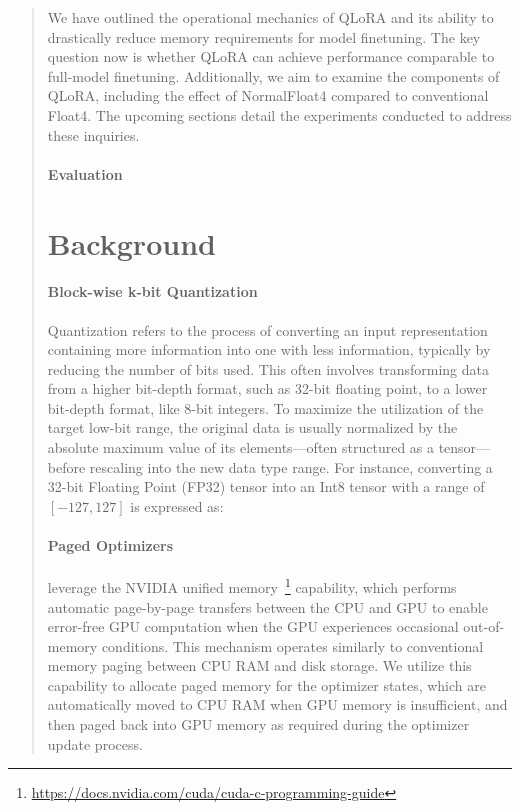 \begin{quote}
We have outlined the operational mechanics of QLoRA and its ability to drastically reduce memory requirements for model finetuning. The key question now is whether QLoRA can achieve performance comparable to full-model finetuning. Additionally, we aim to examine the components of QLoRA, including the effect of NormalFloat4 compared to conventional Float4. The upcoming sections detail the experiments conducted to address these inquiries.

\paragraph{Evaluation}

\section{Background}
\paragraph{Block-wise k-bit Quantization} Quantization refers to the process of converting an input representation containing more information into one with less information, typically by reducing the number of bits used. This often involves transforming data from a higher bit-depth format, such as 32-bit floating point, to a lower bit-depth format, like 8-bit integers. To maximize the utilization of the target low-bit range, the original data is usually normalized by the absolute maximum value of its elements—often structured as a tensor—before rescaling into the new data type range. For instance, converting a 32-bit Floating Point (FP32) tensor into an Int8 tensor with a range of $[-127, 127]$ is expressed as:

\paragraph{Paged Optimizers} leverage the NVIDIA unified memory~\footnote{\tiny \url{https://docs.nvidia.com/cuda/cuda-c-programming-guide}} capability, which performs automatic page-by-page transfers between the CPU and GPU to enable error-free GPU computation when the GPU experiences occasional out-of-memory conditions. This mechanism operates similarly to conventional memory paging between CPU RAM and disk storage. We utilize this capability to allocate paged memory for the optimizer states, which are automatically moved to CPU RAM when GPU memory is insufficient, and then paged back into GPU memory as required during the optimizer update process.


\end{quote}
